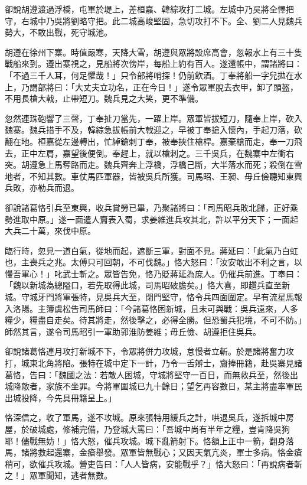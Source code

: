 卻說胡遵渡過浮橋，屯軍於堤上，差桓嘉、韓綜攻打二城。左城中乃吳將全懌把守，右城中乃吳將劉略守把。此二城高峻堅固，急切攻打不下。全、劉二人見魏兵勢大，不敢出戰，死守城池。

胡遵在徐州下寨。時值嚴寒，天降大雪，胡遵與眾將設席高會，忽報水上有三十隻戰船來到。遵出寨視之，見船將次傍岸，每船上約有百人。遂還帳中，謂諸將曰：「不過三千人耳，何足懼哉！」只令部將哨探！仍前飲酒。丁奉將船一字兒拋在水上，乃謂部將曰：「大丈夫立功名，正在今日！」遂令眾軍脫去衣甲，卸了頭盔，不用長槍大戟，止帶短刀。魏兵見之大笑，更不準備。

忽然連珠砲響了三聲，丁奉扯刀當先，一躍上岸。眾軍皆拔短刀，隨奉上岸，砍入魏寨。魏兵措手不及，韓綜急拔帳前大戟迎之，早被丁奉搶入懷內，手起刀落，砍翻在地。桓嘉從左邊轉出，忙綽鎗刺丁奉，被奉挾住槍桿。嘉棄槍而走，奉一刀飛去，正中左肩，嘉望後便倒。奉趕上，就以槍刺之。三千吳兵，在魏寨中左衝右突。胡遵急上馬奪路而走。魏兵齊奔上浮橋，浮橋己斷，大半落水而死；殺倒在雪地者，不知其數。車仗馬匹軍器，皆被吳兵所獲。司馬昭、王昶、毋丘儉聽知東興兵敗，亦勒兵而退。

卻說諸葛恪引兵至東興，收兵賞勞已畢，乃聚諸將曰：「司馬昭兵敗北歸，正好乘勢進取中原。」遂一面遣人齎表入蜀，求姜維進兵攻其北，許以平分天下；一面起大兵二十萬，來伐中原。

臨行時，忽見一道白氣，從地而起，遮斷三軍，對面不見。蔣延曰：「此氣乃白虹也，主喪兵之兆。太傅只可回朝，不可伐魏。」恪大怒曰：「汝安敢出不利之言，以慢吾軍心！」叱武士斬之。眾皆告免，恪乃貶蔣延為庶人。仍催兵前進。丁奉曰：「魏以新城為總隘口，若先取得此城，司馬昭破膽矣。」恪大喜，即趲兵直至新城。守城牙門將軍張特，見吳兵大至，閉門堅守，恪令兵四面圍定。早有流星馬報入洛陽。主簿虞松告司馬師曰：「今諸葛恪困新城，且未可與戰：吳兵遠來，人多糧少，糧盡自走矣。待其將走，然後擊之，必得全勝。但恐蜀兵犯境，不可不防。」師然其言，遂令司馬昭引一軍助郭淮防姜維；毋丘儉、胡遵拒住吳兵。

卻說諸葛恪連月攻打新城不下，令眾將併力攻城，怠慢者立斬。於是諸將奮力攻打，城東北角將陷。張特在城中定下一計，乃令一舌辯士，齎捧冊籍，赴吳寨見諸葛恪，告曰：「魏國之法：若敵人困城，守城將堅守一百日，而無救兵至，然後出城降敵者，家族不坐罪。今將軍圍城已九十餘日；望乞再容數日，某主將盡率軍民出城投降，今先具冊籍呈上。」

恪深信之，收了軍馬，遂不攻城。原來張特用緩兵之計，哄退吳兵，遂拆城中房屋，於破城處，修補完備，乃登城大罵曰：「吾城中尚有半年之糧，豈肯降吳狗耶！儘戰無妨！」恪大怒，催兵攻城。城下亂箭射下。恪額上正中一箭，翻身落馬，諸將救起還寨，金瘡舉發。眾軍皆無戰心；又因天氣亢炎，軍士多病。恪金瘡稍可，欲催兵攻城。營吏告曰：「人人皆病，安能戰乎？」恪大怒曰：「再說病者斬之！」眾軍聞知，逃者無數。

